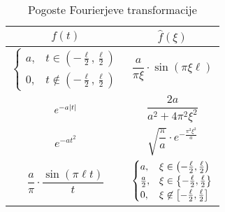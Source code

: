 \begin{table}[!h]
\centering
\caption{Pogoste Fourierjeve transformacije}
\begin{tabular}{c|c}
$f(t)$ & $\hat{f}(\xi)$
\\ 
\hline 
$\displaystyle \begin{cases}
a, & t \in \left(-\frac{\ell}{2},\frac{\ell}{2}\right)
\\
0, & t \not\in \left(-\frac{\ell}{2},\frac{\ell}{2}\right)
\end{cases}$
&
$\dfrac{a}{\pi \xi} \cdot \sin(\pi \xi \ell)$
\\ 
\hline 
$e^{-a \left\lvert t\right\rvert}$
&
$\dfrac{2a}{a^2 + 4 \pi^2 \xi^2}$
\\ 
\hline 
$e^{-a t^2}$
&
$\sqrt{\dfrac{\pi}{a}} \cdot e^{-\frac{\pi^2 \xi^2}{a}}$
\\ 
\hline 
$\dfrac{a}{\pi} \cdot \dfrac{\sin(\pi \ell t)}{t}$
&
$\begin{cases}
a, & \xi \in \left(-\frac{\ell}{2},\frac{\ell}{2}\right)
\\
\frac{a}{2}, & \xi \in \left\{-\frac{\ell}{2},\frac{\ell}{2}\right\}
\\
0, & \xi \not\in \left[-\frac{\ell}{2},\frac{\ell}{2}\right]
\end{cases}$
\end{tabular} 
\end{table}
